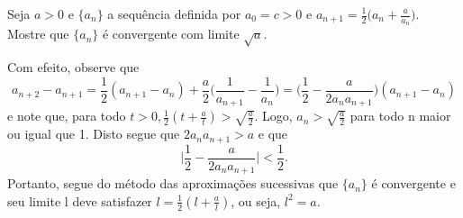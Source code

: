 \documentclass[Analysis/analysis_notes.tex]{subfiles}
\begin{document}
\begin{example}
	Seja $a > 0$ e $\{a_{n}\}$ a sequ\^encia definida por $a_{0} = c > 0$ e $a_{n+1}=\displaystyle \frac{1}{2}\biggl(a_{n} + \frac{a}{a_{n}}\biggr)$. Mostre que
	$\{a_{n}\}$ \'e convergente com limite $\sqrt{a}$.

	Com efeito, observe que
	$$
		a_{n+2} - a_{n+1} = \frac{1}{2}(a_{n+1}-a_{n}) + \frac{a}{2}\biggl(\frac{1}{a_{n+1}}-\frac{1}{a_{n}}\biggr) = \biggl(\frac{1}{2} - \frac{a}{2a_{n}a_{n+1}}\biggr)(a_{n+1}-a_{n})
	$$
	e note que, para todo $t > 0, \frac{1}{2}(t + \frac{a}{t}) > \sqrt{\frac{a}{2}}.$ Logo, $a_{n} > \sqrt{\frac{a}{2}}$ para todo n maior ou igual que 1.
	Disto segue que $2a_{n}a_{n+1} > a$ e que
	$$
		\biggl|\frac{1}{2} - \frac{a}{2a_{n}a_{n+1}}\biggr| < \frac{1}{2}.
	$$
	Portanto, segue do m\'etodo das aproxima\c c\~oes sucessivas que $\{a_{n}\}$ \'e convergente e seu limite l deve satisfazer
	$l = \frac{1}{2}(l + \frac{a}{l})$, ou seja, $l^{2} = a.$ \qedsymbol
\end{example}
\end{document}
